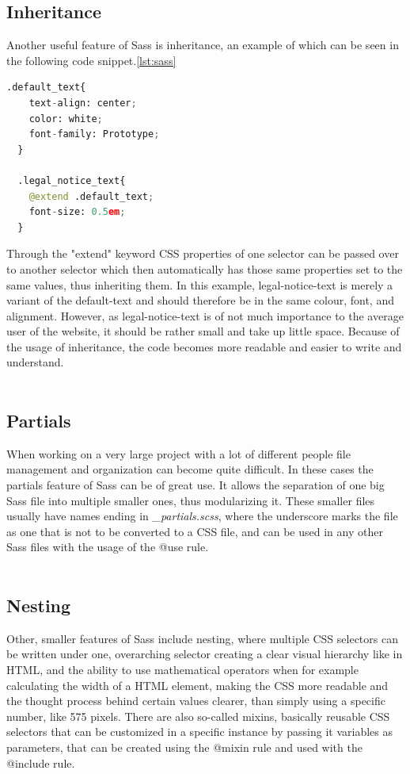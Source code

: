 \subsection{Inheritance}
Another useful feature of Sass is inheritance, an example of which can be seen in the following code snippet.\ref{lst:sass}

\begin{lstlisting}[language=Python,caption=Textstyling in Sass,label=lst:sass]
  .default_text{
    text-align: center;
    color: white;
    font-family: Prototype;
  }

  .legal_notice_text{
    @extend .default_text;
    font-size: 0.5em;
  }
\end{lstlisting}

Through the "extend" keyword CSS properties of one selector can be passed over to another selector which then automatically has those 
same properties set to the same values, thus inheriting them. In this example, legal-notice-text is merely a variant of the 
default-text and should therefore be in the same colour, font, and alignment. However, as legal-notice-text is of not much 
importance to the average user of the website, it should be rather small and take up little space. Because of the usage of 
inheritance, the code becomes more readable and easier to write and understand. \cite{SassInheritance}
\\
\\
\subsection{Partials}
When working on a very large project with a lot of different people file management and organization can become quite difficult. In
these cases the partials feature of Sass can be of great use. It allows the separation of one big Sass file into multiple smaller ones,
thus modularizing it. These smaller files usually have names ending in \emph{_partials.scss}, where the underscore marks the file as one
that is not to be converted to a CSS file, and can be used in any other Sass files with the usage of the @use rule.
\\
\\
\subsection{Nesting}
Other, smaller features of Sass include nesting, where multiple CSS selectors can be written under one, overarching selector creating a
clear visual hierarchy like in HTML, and the ability to use mathematical operators when for example calculating the width of a HTML
element, making the CSS more readable and the thought process behind certain values clearer, than simply using a specific number, like
575 pixels. There are also so-called mixins, basically reusable CSS selectors that can be customized in a specific instance by passing it
variables as parameters, that can be created using the @mixin rule and used with the @include rule.
\\
\\
